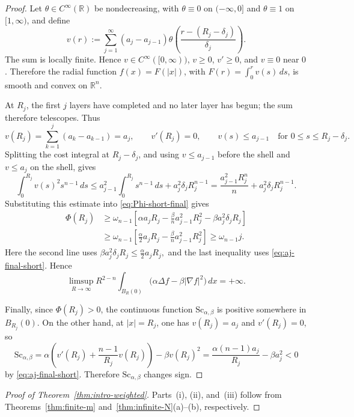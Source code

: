 \documentclass[12pt,oneside,a4paper]{article}
\theoremstyle{mytheorem}
\theoremstyle{remark}
\begin{document}
\begin{proof}
Let \(\theta\in C^\infty(\mathbb R)\) be nondecreasing, with
\(\theta\equiv0\) on \((-\infty,0]\) and \(\theta\equiv1\) on
\([1,\infty)\), and define
\[
  v(r):=
  \sum_{j=1}^{\infty}
  (a_j-a_{j-1})
  \theta\!\left(\frac{r-(R_j-\delta_j)}{\delta_j}\right).
\]
The sum is locally finite. Hence \(v\in C^\infty([0,\infty))\), \(v\ge0\),
\(v'\ge0\), and \(v\equiv0\) near \(0\). Therefore the radial function
\(f(x)=F(|x|)\), with \(F(r)=\int_0^r v(s)\,ds\), is smooth and convex on
\(\mathbb R^n\).

At \(R_j\), the first \(j\) layers have completed and no later layer has
begun; the sum therefore telescopes. Thus
\[
  v(R_j)=\sum_{k=1}^j(a_k-a_{k-1})=a_j,
  \qquad
  v'(R_j)=0,
  \qquad
  v(s)\le a_{j-1}\quad\text{for }0\le s\le R_j-\delta_j.
\]
Splitting the cost integral at \(R_j-\delta_j\), and using \(v\le a_{j-1}\)
before the shell and \(v\le a_j\) on the shell, gives
\[
  \int_0^{R_j}v(s)^2s^{n-1}\,ds
  \le
  a_{j-1}^2\int_0^{R_j}s^{n-1}\,ds
  +
  a_j^2\delta_jR_j^{n-1}
  =
  \frac{a_{j-1}^2R_j^n}{n}
  +
  a_j^2\delta_jR_j^{n-1}.
\]
Substituting this estimate into \eqref{eq:Phi-short-final} gives
\[
\begin{aligned}
  \Phi(R_j)
  &\ge
  \omega_{n-1}
  \left[
    \alpha a_jR_j
    -
    \frac{\beta}{n}a_{j-1}^2R_j^2
    -
    \beta a_j^2\delta_jR_j
  \right]  \\
  &\ge
  \omega_{n-1}
  \left[
    \frac{\alpha}{2}a_jR_j
    -
    \frac{\beta}{n}a_{j-1}^2R_j^2
  \right]
  \ge
  \omega_{n-1}j.
\end{aligned}
\]
Here the second line uses
$\beta a_j^2\delta_jR_j\le \frac{\alpha}{2}a_jR_j,$
and the last inequality uses \eqref{eq:aj-final-short}. Hence
\[
  \limsup_{R\to\infty}
  R^{2-n}
  \int_{B_R(0)}
  \bigl(\alpha\Delta f-\beta|\nabla f|^2\bigr)\,dx
  =
  +\infty .
\]

Finally, since \(\Phi(R_j)>0\), the continuous function
\(\mathrm{Sc}_{\alpha,\beta}\) is positive somewhere in \(B_{R_j}(0)\). On the
other hand, at \(|x|=R_j\), one has \(v(R_j)=a_j\) and \(v'(R_j)=0\), so
\[
  \mathrm{Sc}_{\alpha,\beta}
  =
  \alpha\left(v'(R_j)+\frac{n-1}{R_j}v(R_j)\right)
  -
  \beta v(R_j)^2
  =
  \frac{\alpha(n-1)a_j}{R_j}-\beta a_j^2<0
\]
by \eqref{eq:aj-final-short}. Therefore
\(\mathrm{Sc}_{\alpha,\beta}\) changes sign.
\end{proof}




\begin{proof}[Proof of Theorem~\ref{thm:intro-weighted}]
Parts~\textup{(i)}, \textup{(ii)}, and~\textup{(iii)} follow from
Theorems~\ref{thm:finite-m} and~\ref{thm:infinite-N}\textup{(a)}--\textup{(b)},
respectively.
\end{proof}



\end{document}
